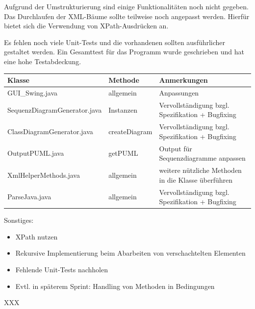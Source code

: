 Aufgrund der Umstrukturierung sind einige Funktionalitäten noch nicht gegeben. Das Durchlaufen der XML-Bäume sollte teilweise noch angepasst werden. Hierfür bietet sich die Verwendung von XPath-Ausdrücken an.
\nsecend%

Es fehlen noch viele Unit-Tests und die vorhandenen sollten ausführlicher gestaltet werden.
Ein Gesamttest für das Programm wurde geschrieben und hat eine hohe Testabdeckung.
\nsecend%

\begin{table}[H]

\begin{tabularx}{\textwidth}{ |l|l|X| }
\hline
\textbf{Klasse} & \textbf{Methode} & \textbf{Anmerkungen}\\
 \hline
 GUI\_Swing.java & allgemein & Anpassungen\\
 \hline
 SequenzDiagramGenerator.java & Instanzen & Vervollständigung bzgl. Spezifikation + Bugfixing\\
 \hline
 ClassDiagramGenerator.java & createDiagram & Vervollständigung bzgl. Spezifikation + Bugfixing\\
 \hline
 OutputPUML.java & getPUML & Output für Sequenzdiagramme anpassen\\
 \hline
 XmlHelperMethods.java & allgemein & weitere nützliche Methoden in die Klasse überführen\\
 \hline
 ParseJava.java & allgemein & Vervollständigung bzgl. Spezifikation + Bugfixing\\
\hline
\end{tabularx}
\end{table}

Sonstiges:
\begin{itemize}
\item XPath nutzen
\item Rekursive Implementierung beim Abarbeiten von verschachtelten Elementen
\item Fehlende Unit-Tests nachholen
\item Evtl. in späterem Sprint: Handling von Methoden in Bedingungen
\end{itemize}
\nsecend%


\nsecend%

XXX
\nsecend%


\nsecend%